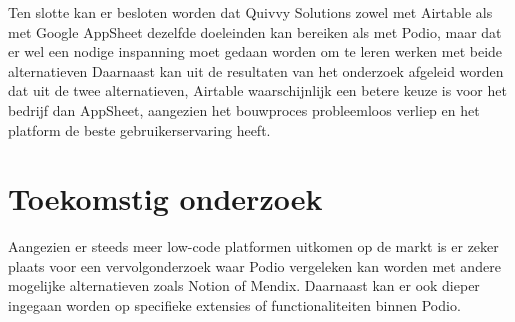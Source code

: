\documentclass[a0,portrait]{hogent-poster}
\begin{document}
\begin{multicols}{2}
Ten slotte kan er besloten worden dat Quivvy Solutions zowel met Airtable als met Google AppSheet dezelfde doeleinden kan bereiken als met Podio, maar dat er wel een nodige inspanning moet gedaan worden om te leren werken met beide alternatieven Daarnaast kan uit de resultaten van het onderzoek afgeleid worden dat uit de twee alternatieven, Airtable waarschijnlijk een betere keuze is voor het bedrijf dan AppSheet, aangezien het bouwproces probleemloos verliep en het platform de beste gebruikerservaring heeft. \\

\section{Toekomstig onderzoek}

Aangezien er steeds meer low-code platformen uitkomen op de markt is er zeker plaats voor een vervolgonderzoek waar Podio vergeleken kan worden met andere mogelijke alternatieven zoals Notion of Mendix. Daarnaast kan er ook dieper ingegaan worden op specifieke extensies of functionaliteiten binnen Podio. \\ 

\end{multicols}
\end{document}
